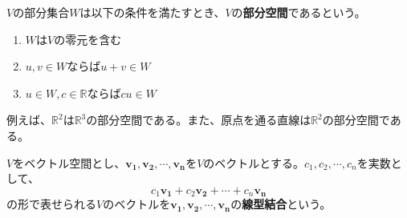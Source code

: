 \documentclass{jlreq}
\begin{document}
\begin{tcolorbox}[enhanced,title=部分空間, 
  attach boxed title to top left, 
  colback=white!95!blue,
  colbacktitle=white!10!blue!50!black,
  drop fuzzy shadow,
  boxrule=0.25mm,
  ]
  $V$の部分集合$W$は以下の条件を満たすとき、$V$の\textbf{部分空間}であるという。

  \begin{enumerate}
    \item $W$は$V$の零元を含む
    \item $u, v \in W$ならば$u + v \in W$
    \item $u \in W, c \in \mathbb{R}$ならば$cu \in W$
  \end{enumerate}
\end{tcolorbox}

例えば、$\mathbb{R}^2$は$\mathbb{R}^3$の部分空間である。また、原点を通る直線は$\mathbb{R}^2$の部分空間である。

\begin{definitionbox}
  $V$をベクトル空間とし、$\boldsymbol{v_1}, \boldsymbol{v_2}, \cdots, \boldsymbol{v_n}$を$V$のベクトルとする。$c_1, c_2, \cdots, c_n$を実数として、
  \begin{equation*}
    c_1 \boldsymbol{v_1} + c_2 \boldsymbol{v_2} + \cdots + c_n \boldsymbol{v_n}
  \end{equation*}
  の形で表せられる$V$のベクトルを$\boldsymbol{v_1}, \boldsymbol{v_2}, \cdots, \boldsymbol{v_n}$の\textbf{線型結合}という。 \\
\end{definitionbox}
\end{document}
